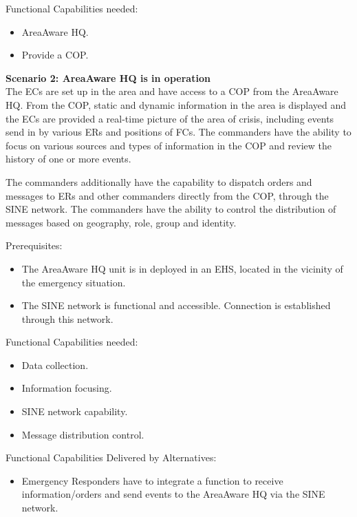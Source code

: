 \noindent Functional Capabilities needed:
\begin{itemize}
	\itemsep0em
	\item AreaAware HQ.
	\item Provide a COP.
\end{itemize}

\vspace{20pt}
\noindent \textbf{Scenario 2: AreaAware HQ is in operation} \\
The ECs are set up in the area and have access to a COP from the AreaAware HQ.
From the COP, static and dynamic information in the area is displayed and the ECs are provided a real-time picture of the area of crisis, including events send in by various ERs and positions of FCs.
The commanders have the ability to focus on various sources and types of information in the COP and review the history of one or more events. 

The commanders additionally have the capability to dispatch orders and messages to ERs and other commanders directly from the COP, through the SINE network. The commanders have the ability to control the distribution of messages based on geography, role, group and identity.

\noindent Prerequisites:
\begin{itemize}
	\itemsep0em
	\item The AreaAware HQ unit is in deployed in an EHS, located in the vicinity of the emergency situation.
	\item The SINE network is functional and accessible. Connection is established through this network.
\end{itemize}

\newpage
\noindent Functional Capabilities needed:
\begin{itemize}
	\itemsep0em
	\item Data collection.
	\item Information focusing.
	\item SINE network capability.
	\item Message distribution control.
\end{itemize}

\noindent Functional Capabilities Delivered by Alternatives:
\begin{itemize}
	\item Emergency Responders have to integrate a function to receive information/orders and send events to the AreaAware HQ via the SINE network.
\end{itemize} 

